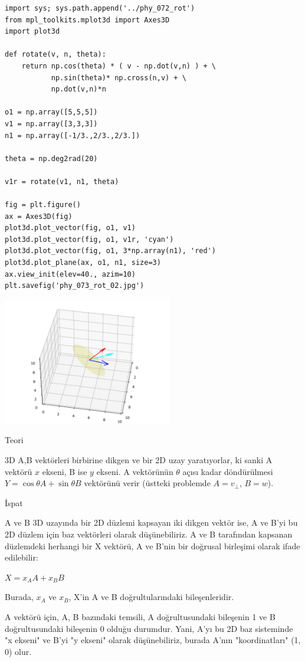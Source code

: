 \documentclass[12pt,fleqn]{article}\usepackage{../../common}
\begin{document}
\begin{verbatim}
import sys; sys.path.append('../phy_072_rot')
from mpl_toolkits.mplot3d import Axes3D
import plot3d

def rotate(v, n, theta):
    return np.cos(theta) * ( v - np.dot(v,n) ) + \
           np.sin(theta)* np.cross(n,v) + \
           np.dot(v,n)*n
 
o1 = np.array([5,5,5])
v1 = np.array([3,3,3])
n1 = np.array([-1/3.,2/3.,2/3.])

theta = np.deg2rad(20)

v1r = rotate(v1, n1, theta)

fig = plt.figure()
ax = Axes3D(fig)
plot3d.plot_vector(fig, o1, v1)
plot3d.plot_vector(fig, o1, v1r, 'cyan')
plot3d.plot_vector(fig, o1, 3*np.array(n1), 'red')
plot3d.plot_plane(ax, o1, n1, size=3)
ax.view_init(elev=40., azim=10)
plt.savefig('phy_073_rot_02.jpg')
\end{verbatim}

\includegraphics[width=20em]{phy_073_rot_02.jpg}

Teori

3D A,B vektörleri birbirine dikgen ve bir 2D uzay yaratıyorlar, ki sanki A
vektörü $x$ ekseni, B ise $y$ ekseni. A vektörünün $\theta$ açısı kadar
döndürülmesi $Y = \cos \theta A + \sin \theta B$ vektörünü verir (üstteki
problemde $A = v_\perp$, $B = w$).

İspat

A ve B 3D uzayında bir 2D düzlemi kapsayan iki dikgen vektör ise, A ve B'yi bu
2D düzlem için baz vektörleri olarak düşünebiliriz. A ve B tarafından kapsanan
düzlemdeki herhangi bir X vektörü, A ve B'nin bir doğrusal birleşimi olarak
ifade edilebilir:

$X = x_A A + x_B B$

Burada, $x_A$ ve $x_B$, X'in A ve B doğrultularındaki bileşenleridir.

A vektörü için, {A, B} bazındaki temsili, A doğrultusundaki bileşenin
1 ve B doğrultusundaki bileşenin 0 olduğu durumdur. Yani, A'yı bu 2D
baz sisteminde "x ekseni" ve B'yi "y ekseni" olarak düşünebiliriz,
burada A'nın "koordinatları" (1, 0) olur.
\end{document}
